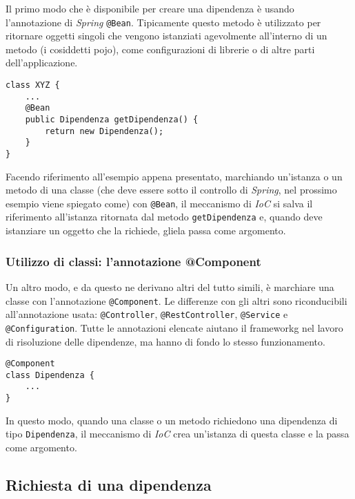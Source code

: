 Il primo modo che è disponibile per creare una dipendenza è usando l'annotazione di \emph{Spring} \texttt{@Bean}. Tipicamente questo metodo è utilizzato per ritornare oggetti singoli che vengono istanziati agevolmente all'interno di un metodo (i cosiddetti \gls{pojo}), come configurazioni di librerie o di altre parti dell'applicazione.\\
\begin{lstlisting}
class XYZ {
    ...
    @Bean
    public Dipendenza getDipendenza() {
        return new Dipendenza();
    }
}
\end{lstlisting}
Facendo riferimento all'esempio appena presentato, marchiando un'istanza o un metodo di una classe (che deve essere sotto il controllo di \emph{Spring}, nel prossimo esempio viene spiegato come) con \texttt{@Bean}, il meccanismo di \emph{IoC} si salva il riferimento all'istanza ritornata dal metodo \texttt{getDipendenza} e, quando deve istanziare un oggetto che la richiede, gliela passa come argomento.

\subsubsection{Utilizzo di classi: l'annotazione @Component}
\label{subsubsec:utilizzo-classi-annotazione-component-spring}

Un altro modo, e da questo ne derivano altri del tutto simili, è marchiare una classe con l'annotazione \texttt{@Component}.
Le differenze con gli altri sono riconducibili all'annotazione usata: \texttt{@Controller}, \texttt{@RestController}, \texttt{@Service} e \texttt{@Configuration}.
Tutte le annotazioni elencate aiutano il \gls{frameworkg} nel lavoro di risoluzione delle dipendenze, ma hanno di fondo lo stesso funzionamento.

\begin{lstlisting}
@Component
class Dipendenza {
    ...
}
\end{lstlisting}
In questo modo, quando una classe o un metodo richiedono una dipendenza di tipo \texttt{Dipendenza}, il meccanismo di \emph{IoC} crea un'istanza di questa classe e la passa come argomento.

\subsection{Richiesta di una dipendenza}
\label{subsec:richiesta-dipendenza-spring}

